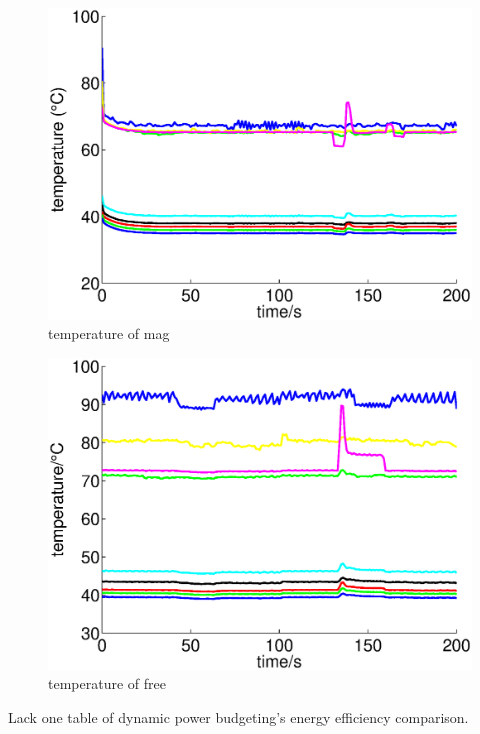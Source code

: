 \begin{figure}
\centering
\includegraphics[width=1\linewidth]{fig/tem_mag.eps}
\caption{temperature of mag}
\end{figure}

\begin{figure}
\centering
\includegraphics[width=1\linewidth]{fig/tem_free.eps}
\caption{temperature of free}
\end{figure}

Lack one table of dynamic power budgeting's energy efficiency comparison.